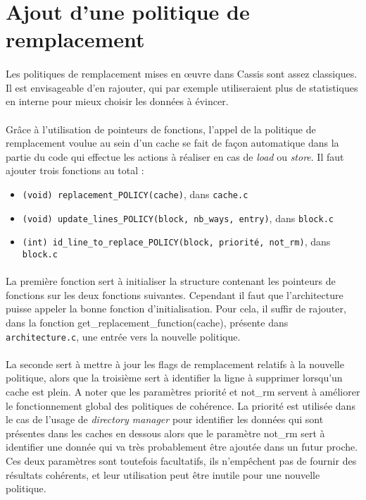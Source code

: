 \section{Ajout d'une politique de remplacement}

\paragraph{}
Les politiques de remplacement mises en {\oe}uvre dans \textsf{Cassis} sont assez classiques. Il est envisageable d'en rajouter, qui par exemple utiliseraient plus de statistiques en interne pour mieux choisir les données à évincer.

\paragraph{}
Grâce à l'utilisation de pointeurs de fonctions, l'appel de la politique de remplacement voulue au sein d'un cache se fait de façon automatique dans la partie du code qui effectue les actions à réaliser en cas de \emph{load} ou \emph{store}. Il faut ajouter trois fonctions au total :
\begin{itemize}
\item \texttt{(void) replacement\_POLICY(cache)}, dans \texttt{cache.c}
\item \texttt{(void) update\_lines\_POLICY(block, nb\_ways, entry)}, dans \texttt{block.c}
\item \texttt{(int) id\_line\_to\_replace\_POLICY(block, priorité, not\_rm)}, dans \texttt{block.c}
\end{itemize}

\paragraph{}
La première fonction sert à initialiser la structure contenant les pointeurs de fonctions sur les deux fonctions suivantes. Cependant il faut que l'architecture puisse appeler la bonne fonction d'initialisation. Pour cela, il suffir de rajouter, dans la fonction get\_replacement\_function(cache), présente dans \texttt{architecture.c}, une entrée vers la nouvelle politique.

\paragraph{}
La seconde sert à mettre à jour les flags de remplacement relatifs à la nouvelle politique, alors que la troisième sert à identifier la ligne à supprimer lorsqu'un cache est plein. A noter que les paramètres priorité et not\_rm servent à améliorer le fonctionnement global des politiques de cohérence. La priorité est utilisée dans le cas de l'usage de \emph{directory manager} pour identifier les données qui sont présentes dans les caches en dessous alors que le paramètre not\_rm sert à identifier une donnée qui va très probablement être ajoutée dans un futur proche. Ces deux paramètres sont toutefois facultatifs, ils n'empêchent pas de fournir des résultats cohérents, et leur utilisation peut être inutile pour une nouvelle politique.

